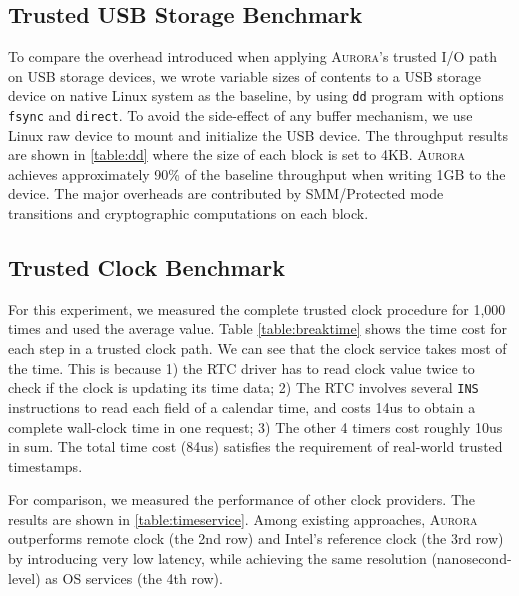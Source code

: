 \documentclass[journal,twocolumn,letterpaper,10pt]{IEEEtran}
\begin{document}
\subsection{Trusted USB Storage Benchmark}

To compare the overhead introduced when applying \textsc{Aurora}'s trusted I/O path on USB storage devices, we wrote variable sizes of contents to a USB storage device on native Linux system as the baseline, by using \texttt{dd} program with options \texttt{fsync} and \texttt{direct}. To avoid the side-effect of any buffer mechanism, we use Linux raw device to mount and initialize the USB device. %
The throughput results are shown in \autoref{table:dd} where the size of each block is set to 4KB. \textsc{Aurora} achieves approximately 90\% of the baseline throughput when writing 1GB to the device. The major overheads are contributed by SMM/Protected mode transitions and cryptographic computations on each block.

\subsection{Trusted Clock Benchmark}\label{time_bench}

For this experiment, we measured the complete trusted clock procedure for 1,000 times and used the average value. Table \ref{table:breaktime} shows the time cost for each step in a trusted clock path. We can see that the clock service takes most of the time. This is because 1) the RTC driver has to read clock value twice to check if the clock is updating its time data; 2) The RTC involves several \texttt{INS} instructions to read each field of a calendar time, and costs 14us to obtain a complete wall-clock time in one request; 3) The other 4 timers cost roughly 10us in sum. The total  time cost (84us) satisfies the requirement of real-world trusted timestamps.

For comparison, we measured the performance of other clock providers. The results are shown in \autoref{table:timeservice}. %
Among existing approaches, \textsc{Aurora} outperforms remote clock (the 2nd row) and Intel's reference clock (the 3rd row) by introducing very low latency, while achieving the same resolution (nanosecond-level) as OS services (the 4th row). 
\end{document}
